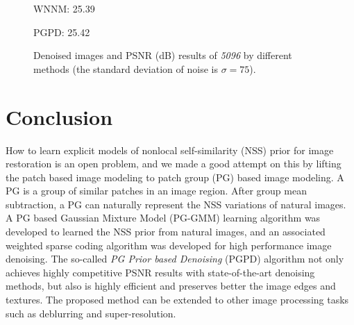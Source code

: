 \begin{figure}[ht!]
{\begin{minipage}[t]{0.24\textwidth}
{\footnotesize WNNM: 25.39}
\end{minipage}
\begin{minipage}[t]{0.24\textwidth}
\centering
{}
{\footnotesize PGPD: 25.42}
\end{minipage}
}\vspace{-3mm}
\caption{Denoised images and PSNR (dB) results of \textsl{5096} by different methods (the standard deviation of noise is $\sigma=75$).}
    \label{fig2-17}
\end{figure}


\section{Conclusion}
How to learn explicit models of nonlocal self-similarity (NSS) prior for image restoration is an open problem, and we made a good attempt on this by lifting the patch based image modeling to patch group (PG) based image modeling. A PG is a group of similar patches in an image region. After group mean subtraction, a PG can naturally represent the NSS variations of natural images. A PG based Gaussian Mixture Model (PG-GMM) learning algorithm was developed to learned the NSS prior from natural images, and an associated weighted sparse coding algorithm was developed for high performance image denoising. The so-called \textsl{PG Prior based Denoising} (PGPD) algorithm not only achieves highly competitive PSNR results with state-of-the-art denoising methods, but also is highly efficient and preserves better the image edges and textures. The proposed method can be extended to other image processing tasks such as deblurring and super-resolution.
